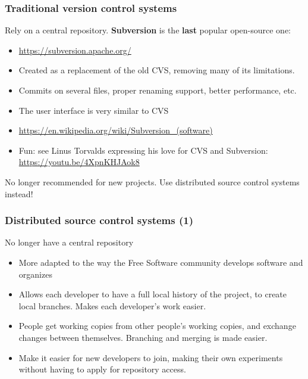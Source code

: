 \begin{frame}
  \frametitle{Traditional version control systems}
  Rely on a central repository. {\bf Subversion} is the {\bf last} popular open-source one:
  \begin{itemize}
  \item \url{https://subversion.apache.org/}
  \item Created as a replacement of the old CVS, removing many of its
      limitations.
  \item Commits on several files, proper renaming support, better
      performance, etc.
  \item The user interface is very similar to CVS
  \item \url{https://en.wikipedia.org/wiki/Subversion_(software)}
  \item Fun: see Linus Torvalds expressing his love for CVS and Subversion:
        \url{https://youtu.be/4XpnKHJAok8}
  \end{itemize}
  No longer recommended for new projects. Use distributed source control
  systems instead!
\end{frame}

\begin{frame}
  \frametitle{Distributed source control systems (1)}
  No longer have a central repository
  \begin{itemize}
  \item More adapted to the way the Free Software community develops
    software and organizes
  \item Allows each developer to have a full local history of the
    project, to create local branches. Makes each developer's work
    easier.
  \item People get working copies from other people's working copies,
    and exchange changes between themselves. Branching and merging is
    made easier.
  \item Make it easier for new developers to join, making their own
    experiments without having to apply for repository access.
  \end{itemize}
\end{frame}

